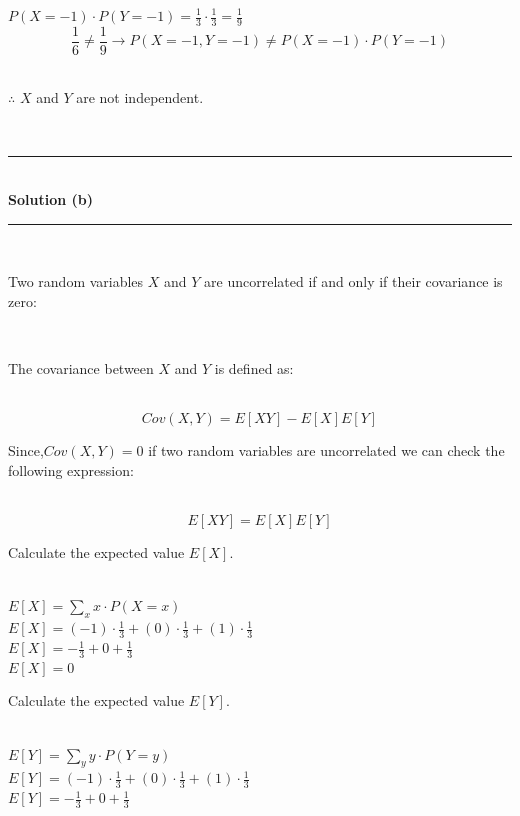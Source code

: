 \documentclass{article}
\begin{document}
$P(X = -1) \cdot P(Y = -1) = \frac{1}{3} \cdot \frac{1}{3} = \frac{1}{9}$\\

$$ \frac{1}{6} \neq \frac{1}{9} \rightarrow P(X = -1, Y = -1) \neq P(X = -1) \cdot P(Y = -1)$$\\

\parbox{\textwidth}{$\therefore$ $X$ and $Y$ are not independent.}\\

\noindent\rule{\textwidth}{0.4pt}\\

\textbf{Solution (b)}

\noindent\rule{\textwidth}{0.4pt}\\

\parbox{\textwidth}{Two random variables $X$ and $Y$ are uncorrelated if and only if their covariance is zero:}\\

\parbox{\textwidth}{The covariance between $X$ and $Y$ is defined as:}\\

$$Cov(X,Y) = E[XY] - E[X]E[Y]$$

\parbox{\textwidth}{Since,$Cov(X,Y) = 0$ if two random variables are uncorrelated we can check the following expression:}\\

$$E[XY] = E[X]E[Y]$$

\parbox{\textwidth}{Calculate the expected value $E[X]$.}\\

$E[X] = \sum_{x} x \cdot P(X = x)$\\

$E[X] = (-1) \cdot \frac{1}{3} + (0) \cdot \frac{1}{3} + (1) \cdot \frac{1}{3}$\\

$E[X] = -\frac{1}{3} + 0 + \frac{1}{3}$\\

$E[X] = 0$\\

\parbox{\textwidth}{Calculate the expected value $E[Y]$.}\\

$E[Y] = \sum_{y} y \cdot P(Y = y)$\\

$E[Y] = (-1) \cdot \frac{1}{3} + (0) \cdot \frac{1}{3} + (1) \cdot \frac{1}{3}$\\

$E[Y] = -\frac{1}{3} + 0 + \frac{1}{3}$\\
\end{document}
